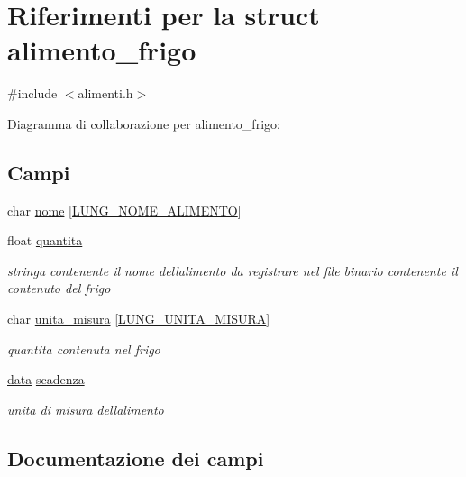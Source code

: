 \hypertarget{structalimento__frigo}{}\section{Riferimenti per la struct alimento\+\_\+frigo}
\label{structalimento__frigo}


{\ttfamily \#include $<$alimenti.\+h$>$}



Diagramma di collaborazione per alimento\+\_\+frigo\+:
\subsection*{Campi}
\begin{DoxyCompactItemize}
\item 
char \hyperlink{structalimento__frigo_ab82a4dd2da2736664b91dc46110338b2}{nome} \mbox{[}\hyperlink{alimenti_8h_af503a16b1a63b47d6a5b2edd94b5caf2}{L\+U\+N\+G\+\_\+\+N\+O\+M\+E\+\_\+\+A\+L\+I\+M\+E\+N\+TO}\mbox{]}
\item 
float \hyperlink{structalimento__frigo_a779484a556c1d08624a6d6db4fcd37e7}{quantita}
\begin{DoxyCompactList}\small\item\em stringa contenente il nome dell\textquotesingle{}alimento da registrare nel file binario contenente il contenuto del frigo \end{DoxyCompactList}\item 
char \hyperlink{structalimento__frigo_ae2ab4650f20280f28006aff3616952c6}{unita\+\_\+misura} \mbox{[}\hyperlink{alimenti_8h_ade0f1f034a3ec6c04b8e29f4730db983}{L\+U\+N\+G\+\_\+\+U\+N\+I\+T\+A\+\_\+\+M\+I\+S\+U\+RA}\mbox{]}
\begin{DoxyCompactList}\small\item\em quantita contenuta nel frigo \end{DoxyCompactList}\item 
\hyperlink{structdata}{data} \hyperlink{structalimento__frigo_a87cbbe37d01409e7006a9eb203bc6263}{scadenza}
\begin{DoxyCompactList}\small\item\em unita di misura dell\textquotesingle{}alimento \end{DoxyCompactList}\end{DoxyCompactItemize}


\subsection{Documentazione dei campi}
\mbox{\label{structalimento__frigo_ab82a4dd2da2736664b91dc46110338b2}} 
